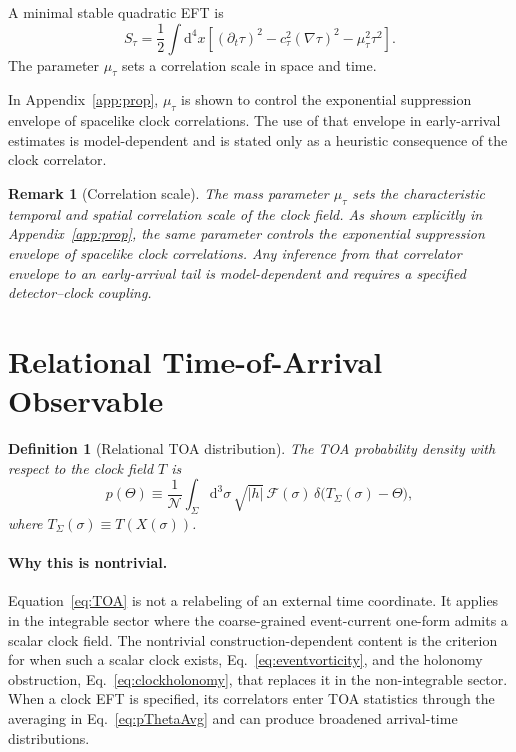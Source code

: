 \documentclass[pdflatex,sn-mathphys-num]{sn-jnl}
\theoremstyle{thmstylethree}
\newtheorem{definition}{Definition}[section]
\theoremstyle{thmstyleone}
\theoremstyle{thmstyletwo}
\newtheorem{remark}{Remark}[section]
\numberwithin{equation}{section}
\newcommand{\dd}{\mathrm{d}}
\newcommand{\Sig}{\Sigma}
\newcommand{\F}{\mathcal{F}}
\begin{document}
    A minimal stable quadratic EFT is
    \begin{equation}
        S_\tau = \frac{1}{2}\int \dd^4x
        \left[
            (\partial_t\tau)^2
        - c_\tau^2(\nabla\tau)^2
        - \mu_\tau^2 \tau^2
        \right].
        \label{eq:clockEFT}
    \end{equation}
    The parameter $\mu_\tau$ sets a correlation scale in space and time.
    
    In Appendix~\ref{app:prop}, $\mu_\tau$ is shown to control the exponential suppression envelope of spacelike clock correlations. The use of that envelope in early-arrival estimates is model-dependent and is stated only as a heuristic consequence of the clock correlator.
    
    \begin{remark}[Correlation scale]
The mass parameter $\mu_\tau$ sets the characteristic temporal and spatial correlation scale of the clock field. As shown explicitly in Appendix~\ref{app:prop}, the same parameter controls the exponential suppression envelope of spacelike clock correlations. Any inference from that correlator envelope to an early-arrival tail is model-dependent and requires a specified detector--clock coupling.
    \end{remark}

    \section{Relational Time-of-Arrival Observable}\label{sec:toaobservable}
    
    \begin{definition}[Relational TOA distribution]
The TOA probability density with respect to the clock field $T$ is
\begin{equation}
    p(\Theta) \equiv
    \frac{1}{\mathcal{N}}
    \int_\Sig \dd^3\sigma\,\sqrt{|h|}\,
    \F(\sigma)\,
    \delta\!\big(T_\Sig(\sigma)-\Theta\big),
    \label{eq:TOA}
\end{equation}
where $T_\Sig(\sigma)\equiv T(X(\sigma))$.
    \end{definition}
    
    \paragraph{Why this is nontrivial.}
        Equation~\eqref{eq:TOA} is not a relabeling of an external time coordinate. It applies in the integrable sector where the coarse-grained event-current one-form admits a scalar clock field. The nontrivial construction-dependent content is the criterion for when such a scalar clock exists, Eq.~\eqref{eq:eventvorticity}, and the holonomy obstruction, Eq.~\eqref{eq:clockholonomy}, that replaces it in the non-integrable sector. When a clock EFT is specified, its correlators enter TOA statistics through the averaging in Eq.~\eqref{eq:pThetaAvg} and can produce broadened arrival-time distributions.
        
\end{document}
